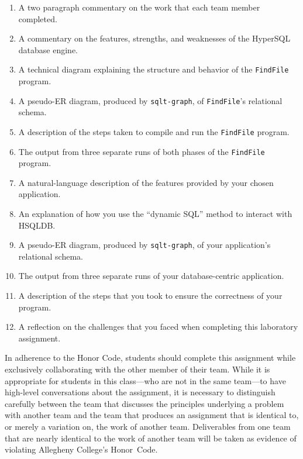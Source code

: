 
\begin{enumerate}
    \setlength{\itemsep}{0pt}
  \item A two paragraph commentary on the work that each team member completed. 
  \item A commentary on the features, strengths, and weaknesses of the HyperSQL database engine.
  \item A technical diagram explaining the structure and behavior of the {\tt FindFile} program.
  \item A pseudo-ER diagram, produced by {\tt sqlt-graph}, of {\tt FindFile}'s relational schema.
  \item A description of the steps taken to compile and run the {\tt FindFile} program.
  \item The output from three separate runs of both phases of the {\tt FindFile} program.
  \item A natural-language description of the features provided by your chosen application.
  \item An explanation of how you use the ``dynamic SQL'' method to interact with HSQLDB.
  \item A pseudo-ER diagram, produced by {\tt sqlt-graph}, of your application's relational schema.
  \item The output from three separate runs of your database-centric application.
  \item A description of the steps that you took to ensure the correctness of your program.
  \item A reflection on the challenges that you faced when completing this laboratory assignment.
\end{enumerate}


In adherence to the Honor Code, students should complete this assignment while exclusively collaborating with the
other member of their team. While it is appropriate for students in this class---who are not in the same team---to have
high-level conversations about the assignment, it is necessary to distinguish carefully between the team that discusses
the principles underlying a problem with another team and the team that produces an assignment that is identical to, or
merely a variation on, the work of another team.  Deliverables from one team that are nearly identical to the work of
another team will be taken as evidence of violating Allegheny College's \mbox{Honor Code}.



